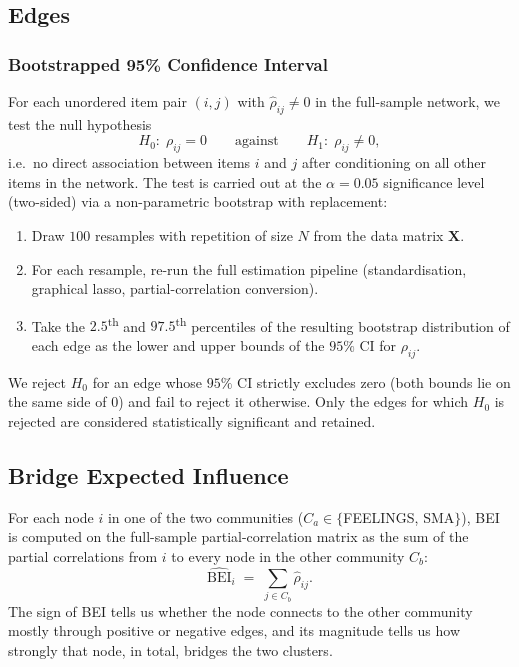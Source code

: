 \documentclass{article}
\begin{document}
\subsection{Edges}

\subsubsection{Bootstrapped 95\% Confidence Interval}
\label{sec:edges-ci}
For each unordered item pair $(i, j)$ with $\hat{\rho}_{ij} \neq 0$ in
the full-sample network, we test the null hypothesis
\[
    H_0:\; \rho_{ij} = 0 \qquad \text{against} \qquad
    H_1:\; \rho_{ij} \neq 0,
\]
i.e.\ no direct association between items $i$ and $j$ after conditioning on all other items in the network. The test is carried out at the $\alpha = 0.05$ significance level (two-sided) via a non-parametric bootstrap with replacement:

\begin{enumerate}
    \item Draw $100$ resamples with repetition of size $N$ from the data
        matrix $\mathbf{X}$.

    \item For each resample, re-run the full estimation pipeline
        (standardisation, graphical lasso, partial-correlation
        conversion).

    \item Take the $2.5$\textsuperscript{th} and
        $97.5$\textsuperscript{th} percentiles of the resulting bootstrap
        distribution of each edge as the lower and upper bounds of the
        $95\%$ CI for $\rho_{ij}$.
\end{enumerate}

We reject $H_0$ for an edge whose $95\%$ CI strictly excludes zero (both bounds lie on the same side of $0$) and fail to reject it otherwise. Only the edges for which $H_0$ is rejected are considered statistically significant and retained.

\subsection{Bridge Expected Influence}
For each node $i$ in one of the two communities
($C_a \in \{$FEELINGS, SMA$\}$),
BEI~\parencite{jones2021bridge} is computed on the full-sample
partial-correlation matrix as the sum of the partial correlations from
$i$ to every node in the other community $C_b$:
\[
    \widehat{\mathrm{BEI}}_i \;=\;
        \sum_{j \in C_b} \widehat{\rho}_{ij}.
\]
The sign of BEI tells us whether the node connects to the other
community mostly through positive or negative edges, and its magnitude
tells us how strongly that node, in total, bridges the two clusters.
\end{document}
